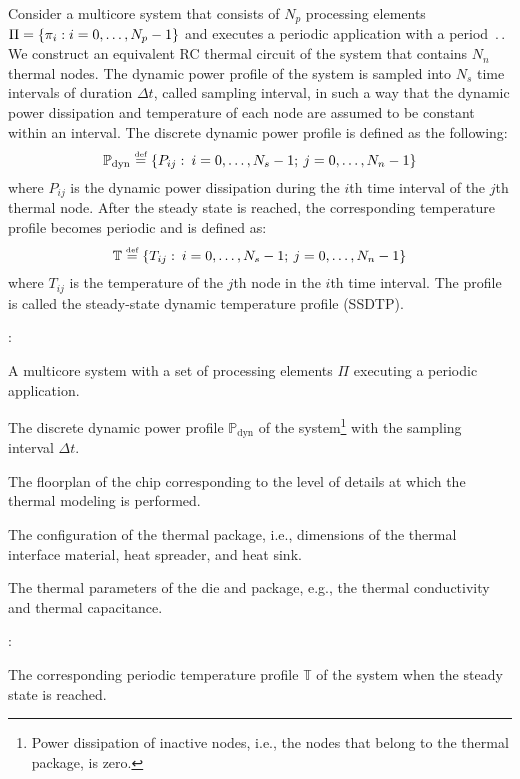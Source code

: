 Consider a multicore system that consists of $N_p$ processing elements $\Pi = \{ \pi_i: i = 0, \dots, N_p - 1 \}$ and executes a periodic application with a period $\period$. We construct an equivalent RC thermal circuit of the system that contains $N_n$ thermal nodes. The dynamic power profile of the system is sampled into $N_s$ time intervals of duration $\Delta t$, called sampling interval, in such a way that the dynamic power dissipation and temperature of each node are assumed to be constant within an interval. The discrete dynamic power profile is defined as the following:
\[
\mathbb{P}_\text{dyn} \eqdef \{ P_{ij}: \: i = \range{0}{N_s - 1}; \: j = \range{0}{N_n - 1} \}
\]
where $P_{ij}$ is the dynamic power dissipation during the $i$th time interval of the $j$th thermal node. After the steady state is reached, the corresponding temperature profile becomes periodic and is defined as:
\[
\mathbb{T} \eqdef \{ T_{ij}: \: i = \range{0 }{N_s - 1}; \: j = \range{0}{N_n - 1} \}
\]
where $T_{ij}$ is the temperature of the $j$th node in the $i$th time interval. The profile is called the steady-state dynamic temperature profile (SSDTP).

:
\begin{ilist}
  \item A multicore system with a set of processing elements $\Pi$ executing a periodic application.
  \item The discrete dynamic power profile $\mathbb{P}_\text{dyn}$ of the system\footnote{Power dissipation of inactive nodes, i.e., the nodes that belong to the thermal package, is zero.} with the sampling interval $\Delta t$.
  \item The floorplan of the chip corresponding to the level of details at which the thermal modeling is performed.
  \item The configuration of the thermal package, i.e., dimensions of the thermal interface material, heat spreader, and heat sink.
  \item The thermal parameters of the die and package, e.g., the thermal conductivity and thermal capacitance.
\end{ilist}

:
\begin{ilist}
  \item The corresponding periodic temperature profile $\mathbb{T}$ of the system when the steady state is reached.
\end{ilist}
